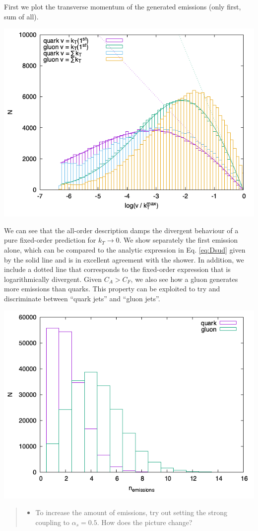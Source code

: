 \documentclass[11pt]{article}
\begin{document}
First we plot the transverse momentum of the generated emissions (only first, sum of all).
\begin{center}
\includegraphics[width=.9\linewidth]{plotKT.png}
\label{}
\end{center}



We can see that the all-order description damps the divergent behaviour of a pure fixed-order prediction for \(k_T\to0\).
We show separately the first emission alone, which can be compared to the analytic expression in Eq. \eqref{eq:Dsud} given by the solid line and is in excellent agreement with the shower.
In addition, we include a dotted line that corresponds to the fixed-order expression that is logarithmically divergent.
Given \(C_A > C_F\), we also see how a gluon generates more emissions than quarks.
This property can be exploited to try and discriminate between ``quark jets'' and ``gluon jets''.


\begin{center}
\includegraphics[width=.9\linewidth]{plotN.png}
\label{}
\end{center}




\begin{quote}
\begin{itemize}
\item To increase the amount of emissions, try out setting the strong coupling to \(\alpha_s=0.5\).
How does the picture change?
\end{itemize}
\end{quote}
\end{document}
